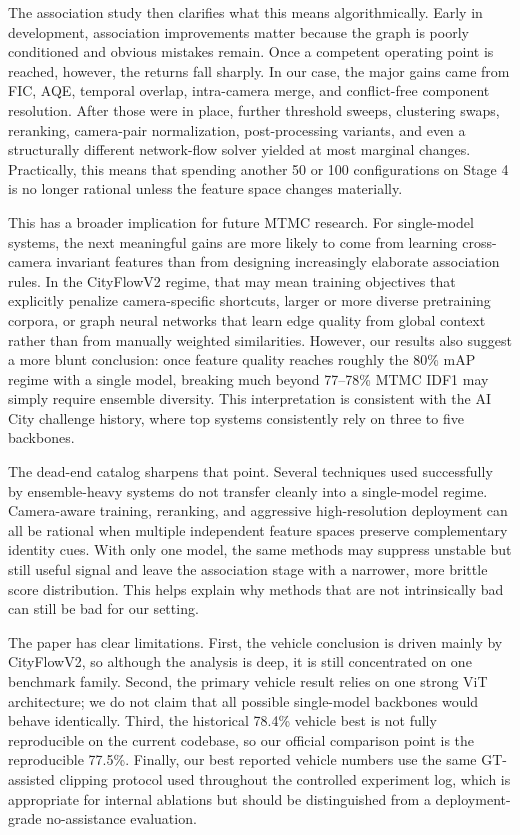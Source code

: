 \documentclass{ieeeaccess}
\begin{document}
The association study then clarifies what this means algorithmically. Early in development, association improvements matter because the graph is poorly conditioned and obvious mistakes remain. Once a competent operating point is reached, however, the returns fall sharply. In our case, the major gains came from FIC, AQE, temporal overlap, intra-camera merge, and conflict-free component resolution. After those were in place, further threshold sweeps, clustering swaps, reranking, camera-pair normalization, post-processing variants, and even a structurally different network-flow solver yielded at most marginal changes. Practically, this means that spending another 50 or 100 configurations on Stage 4 is no longer rational unless the feature space changes materially.

This has a broader implication for future MTMC research. For single-model systems, the next meaningful gains are more likely to come from learning cross-camera invariant features than from designing increasingly elaborate association rules. In the CityFlowV2 regime, that may mean training objectives that explicitly penalize camera-specific shortcuts, larger or more diverse pretraining corpora, or graph neural networks that learn edge quality from global context rather than from manually weighted similarities. However, our results also suggest a more blunt conclusion: once feature quality reaches roughly the 80\% mAP regime with a single model, breaking much beyond 77--78\% MTMC IDF1 may simply require ensemble diversity. This interpretation is consistent with the AI City challenge history, where top systems consistently rely on three to five backbones.

The dead-end catalog sharpens that point. Several techniques used successfully by ensemble-heavy systems do not transfer cleanly into a single-model regime. Camera-aware training, reranking, and aggressive high-resolution deployment can all be rational when multiple independent feature spaces preserve complementary identity cues. With only one model, the same methods may suppress unstable but still useful signal and leave the association stage with a narrower, more brittle score distribution. This helps explain why methods that are not intrinsically bad can still be bad for our setting.

The paper has clear limitations. First, the vehicle conclusion is driven mainly by CityFlowV2, so although the analysis is deep, it is still concentrated on one benchmark family. Second, the primary vehicle result relies on one strong ViT architecture; we do not claim that all possible single-model backbones would behave identically. Third, the historical 78.4\% vehicle best is not fully reproducible on the current codebase, so our official comparison point is the reproducible 77.5\%. Finally, our best reported vehicle numbers use the same GT-assisted clipping protocol used throughout the controlled experiment log, which is appropriate for internal ablations but should be distinguished from a deployment-grade no-assistance evaluation.
\end{document}
